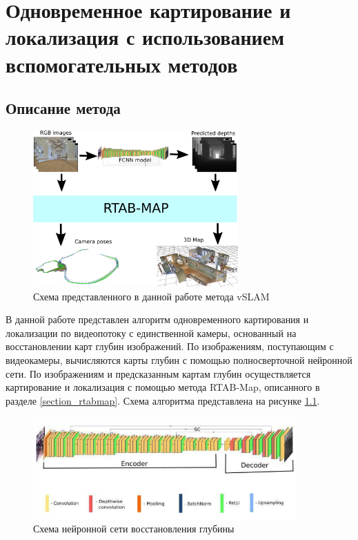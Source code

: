 \documentclass{mipt-thesis-ms}
\begin{document}
	
	\chapter{Одновременное картирование и локализация с использованием вспомогательных методов}
	\label{chapter_our_slam}
	
	\section{Описание метода}
	
	\begin{figure}
		\centering
		\includegraphics[width=0.7\textwidth]{img/slam_scheme.png}
		\caption{Схема представленного в данной работе метода vSLAM}
		\label{figure_our_slam_pipeline}
	\end{figure}
	
	В данной работе представлен алгоритм одновременного картирования и локализации по видеопотоку с единственной камеры, основанный на восстановлении карт глубин изображений. По изображениям, поступающим с видеокамеры, вычисляются карты глубин с помощью полносверточной нейронной сети. По изображениям и предсказанным картам глубин осуществляется картирование и локализация с помощью метода RTAB-Map, описанного в разделе \ref{section_rtabmap}. Схема алгоритма представлена на рисунке \ref{figure_our_slam_pipeline}.
	
	\begin{figure}
		\centering
		\includegraphics[width=0.9\textwidth]{img/fcnn_scheme.png}
		\caption{Схема нейронной сети восстановления глубины}
		\label{figure_our_fcnn}
	\end{figure}
	
\end{document}
